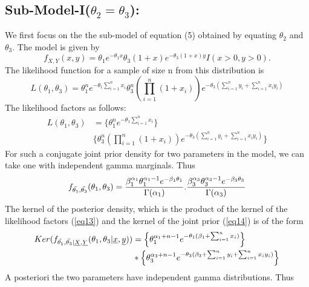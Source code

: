 \documentclass[12pt]{article}    %
\numberwithin{equation}{section}
\begin{document}
\subsection{Sub-Model-I($\theta_2=\theta_3$):}
We first focus on the the sub-model of equation (5) obtained by equating $\theta_2$ and $\theta_3$. The model is given by
\begin{equation}\label{eq12}
f_{X,Y}(x,y) = \theta_1e^{-\theta_1x}\theta_3(1+x)e^{-\theta_3(1+x)y}I(x>0,y>0).
\end{equation}
The likelihood function for a sample of size n from this distribution is 
\begin{equation*}
L(\theta_1, \theta_3) = \theta_1^n e^{-\theta_1\sum^n_{i=1}x_i}\theta_3^n(\prod^n_{i=1}(1+x_i)) e^{-\theta_3(\sum^n_{i=1}y_i+\sum^n_{i=1}x_iy_i)}
\end{equation*}
The likelihood factors as follows:
\begin{equation}\label{eq13}
\begin{split}
L(\theta_1, \theta_3) & = \Big \{ \theta_1^n e^{-\theta_1\sum^n_{i=1}x_i} \Big \} \\
& \Big \{\theta_3^n(\prod^n_{i=1}(1+x_i)) e^{-\theta_3(\sum^n_{i=1}y_i+\sum^n_{i=1}x_iy_i)} \Big \}
\end{split}
\end{equation}
For such a conjugate joint prior density for two parameters in the model, we can take one with independent gamma marginals. Thus
\begin{equation}\label{eq14}
f_{\Tilde{\theta_1},\Tilde{\theta_3}}(\theta_1,\theta_3) = \frac{\beta^{\alpha_1}_1\theta_1^{\alpha_1-1}e^{-\beta_1\theta_1}}{\Gamma(\alpha_1)}. \frac{\beta^{\alpha_3}_3\theta_3^{\alpha_3-1}e^{-\beta_3\theta_3}}{\Gamma(\alpha_3)}
\end{equation}
The kernel of the posterior density, which is the product of the kernel of the likelihood factors (\ref{eq13}) and the kernel of the joint prior (\ref{eq14}) is of the form
\begin{equation}\label{eq15}
\begin{split}
Ker(f_{\Tilde{\theta_1},\Tilde{\theta_3}|\underline{X},\underline{Y}}(\theta_1,\theta_3|\underline{x},\underline{y})) & = \Big \{ \theta_1^{\alpha_1+n-1}e^{-\theta_1(\beta_1+\sum^n_{i=1}x_i)} \Big \} \\
& * \Big \{ \theta_3^{\alpha_3+n-1}e^{-\theta_3(\beta_3+\sum^n_{i=1}y_i+\sum^n_{i=1}x_iy_i)} \Big \}
\end{split}
\end{equation}
A posteriori the two parameters have independent gamma distributions. Thus
\end{document}
